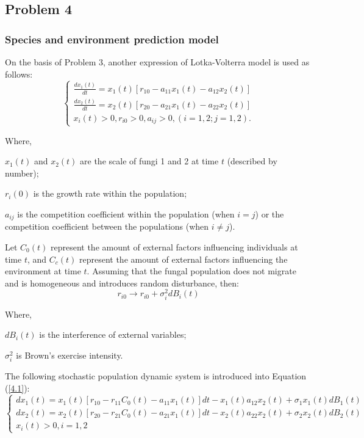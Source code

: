 \subsection{Problem 4}
\subsubsection{Species and environment prediction model}

On the basis of Problem 3, another expression of Lotka-Volterra model is used as follows:
\begin{equation}\label{4.1}
    \left\{
    \begin{array}{l}
        \frac{dx_{1}(t)}{dt}=x_{1}(t)[r_{10}-a_{11}x_{1}(t)-a_{12}x_{2}(t)] \\
        \frac{dx_{2}(t)}{dt}=x_{2}(t)[r_{20}-a_{21}x_{1}(t)-a_{22}x_{2}(t)]  \\
        x_{i}(t)>0, r_{i0}>0, a_{ij}>0,(i=1,2;j=1,2).
    \end{array}
    \right.
    \end{equation}

Where,

$x_{1}(t)$ and $x_{2}(t)$ are the scale of fungi 1 and 2 at time $t$ (described by number);

$r_{i}(0)$ is the growth rate within the population;

$a_{ij}$ is the competition coefficient within the population (when $i=j$) or the competition coefficient between the populations (when $i\neq j$).

Let $C_{0}(t)$ represent the amount of external factors influencing individuals at time $t$, and $C_{c}(t)$ represent the amount of external factors influencing the environment at time $t$. Assuming that the fungal population does not migrate and is homogeneous and introduces random disturbance, then:
\begin{equation}\label{}
    r_{i0} \to r_{i0} + \sigma_{i}^2 dB_{i}(t)
\end{equation}

Where,

$dB_{i}(t)$ is the interference of external variables;

$\sigma_{i}^2$ is Brown's exercise intensity.

The following stochastic population dynamic system is introduced into Equation (\ref{4.1}):
\begin{equation}\label{4.2}
    \left\{
    \begin{array}{l}
        dx_{1}(t)=x_{1}(t)[r_{10}-r_{11}C_{0}(t)-a_{11}x_{1}(t)]dt-x_{1}(t)a_{12}x_{2}(t)+\sigma_{1}x_{1}(t)dB_{1}(t) \\

        dx_{2}(t)=x_{2}(t)[r_{20}-r_{21}C_{0}(t)-a_{21}x_{1}(t)]dt-x_{2}(t)a_{22}x_{2}(t)+\sigma_{2}x_{2}(t)dB_{2}(t) \\
        x_{i}(t)>0,i=1,2
    \end{array}
    \right.
    \end{equation}

